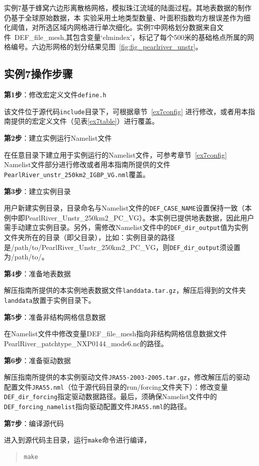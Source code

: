 实例7基于蜂窝六边形离散格网格，模拟珠江流域的陆面过程。其地表数据的制作仍基于全球原始数据，本
实验采用土地类型数量、叶面积指数均方根误差作为细化阈值，对所选区域内网格进行单次细化。实例7中网格划分数据来自文件~DEF\_file\_mesh,其包含变量`elmindex'，标记了每个500米的基础格点所属的网格编号。六边形网格的划分结果见图~\ref{fig:fig_pearlriver_unstr}。
\subsection{实例7操作步骤}
\textbf{第1步}：修改宏定义文件\texttt{define.h}

该文件位于源代码\texttt{include}目录下，可根据章节~\ref{ex7config} 进行修改，或者用本指南提供的宏定义文件（见表\ref{ex7table}）进行覆盖。

\bigskip
\textbf{第2步}：建立实例运行Namelist文件

在任意目录下建立用于实例运行的Namelist文件，可参考章节~\ref{ex7config} Namelist文件部分进行修改或者用本指南所提供的文件\texttt{PearlRiver\_unstr\_250km2\_IGBP\_VG.nml}覆盖。

\bigskip
\textbf{第3步}：建立实例目录

用户新建实例目录，目录命名与Namelist文件的\texttt{DEF\_CASE\_NAME}设置保持一致（本例中即PearlRiver\_Unstr\_250km2\_PC\_VG）。本实例已提供地表数据，因此用户需手动建立实例目录。另外，需修改Namelist文件中的\texttt{DEF\_dir\_output}值为实例文件夹所在的目录（即父目录），比如：实例目录的路径是/path/to/PearlRiver\_Unstr\_250km2\_PC\_VG，则\texttt{DEF\_dir\_output}须设置为/path/to/。

\bigskip
\textbf{第4步}：准备地表数据

解压指南所提供的本实例地表数据文件\texttt{landdata.tar.gz}，解压后得到的文件夹\texttt{landdata}放置于实例目录下。

\bigskip
\textbf{第5步}：准备非结构网格信息数据

在Namelist文件中修改变量DEF\_file\_mesh指向非结构网格信息数据文件PearlRiver\_patchtype\_NXP0144\_mode6.nc的路径。

\bigskip
\textbf{第6步}：准备驱动数据

解压指南所提供的本实例驱动文件\texttt{JRA55-2003-2005.tar.gz}，修改解压后的驱动配置文件\texttt{JRA55.nml}（位于源代码目录的run/forcing文件夹下）：修改变量\texttt{DEF\_dir\_forcing}指定驱动数据路径。最后，须确保Namelist文件中的\texttt{DEF\_forcing\_namelist}指向驱动配置文件\texttt{JRA55.nml}的路径。

\bigskip
\textbf{第7步}：编译源代码

进入到源代码主目录，运行\texttt{make}命令进行编译，
\begin{quote}
\begin{lstlisting}
make
\end{lstlisting}
\end{quote}

